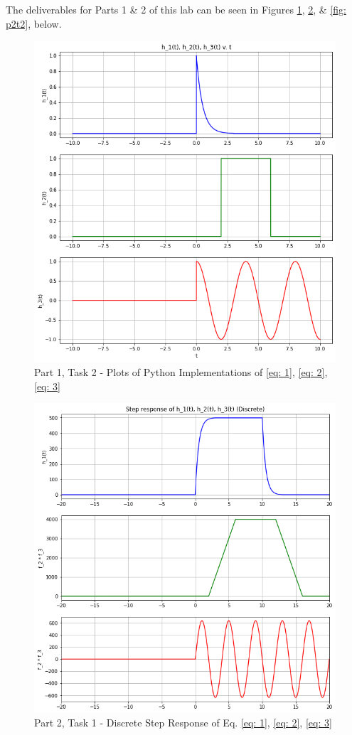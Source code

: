 \documentclass[12pt]{report}
\begin{document}
The deliverables for Parts 1 \& 2 of this lab can be seen in Figures \ref{fig: p1t2}, \ref{fig: p2t1}, \& \ref{fig: p2t2}, below.
\\
\begin{figure}[h!]
  \centering
  \includegraphics[scale=0.5]{p1t2.png}
  \caption{Part 1, Task 2 - Plots of Python Implementations of \eqref{eq: 1}, \eqref{eq: 2}, \eqref{eq: 3}}
  \label{fig: p1t2}
\end{figure}
\begin{figure}[h!]
  \centering
  \includegraphics[scale=0.5]{p2t1.png}
  \caption{Part 2, Task 1 - Discrete Step Response of Eq. \eqref{eq: 1}, \eqref{eq: 2}, \eqref{eq: 3}}
  \label{fig: p2t1}
\end{figure}
\end{document}
